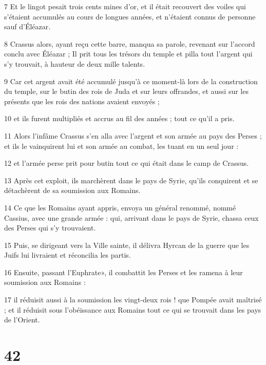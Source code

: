 \par 7 Et le lingot pesait trois cents mines d'or, et il était recouvert des voiles qui s'étaient accumulés au cours de longues années, et n'étaient connus de personne sauf d'Éléazar.

\par 8 Crassus alors, ayant reçu cette barre, manqua sa parole, revenant sur l'accord conclu avec Éléazar ; Il prit tous les trésors du temple et pilla tout l'argent qui s'y trouvait, à hauteur de deux mille talents.

\par 9 Car cet argent avait été accumulé jusqu'à ce moment-là lors de la construction du temple, sur le butin des rois de Juda et sur leurs offrandes, et aussi sur les présents que les rois des nations avaient envoyés ;

\par 10 et ils furent multipliés et accrus au fil des années ; tout ce qu'il a pris.

\par 11 Alors l'infâme Crassus s'en alla avec l'argent et son armée au pays des Perses ; et ils le vainquirent lui et son armée au combat, les tuant en un seul jour :

\par 12 et l'armée perse prit pour butin tout ce qui était dans le camp de Crassus.

\par 13 Après cet exploit, ils marchèrent dans le pays de Syrie, qu'ils conquirent et se détachèrent de sa soumission aux Romains.

\par 14 Ce que les Romains ayant appris, envoya un général renommé, nommé Cassius, avec une grande armée : qui, arrivant dans le pays de Syrie, chassa ceux des Perses qui s'y trouvaient.

\par 15 Puis, se dirigeant vers la Ville sainte, il délivra Hyrcan de la guerre que les Juifs lui livraient et réconcilia les partis.

\par 16 Ensuite, passant l'Euphrate», il combattit les Perses et les ramena à leur soumission aux Romains :

\par 17 il réduisit aussi à la soumission les vingt-deux rois ! que Pompée avait maîtrisé ; et il réduisit sous l'obéissance aux Romains tout ce qui se trouvait dans les pays de l'Orient.

\chapter{42}

